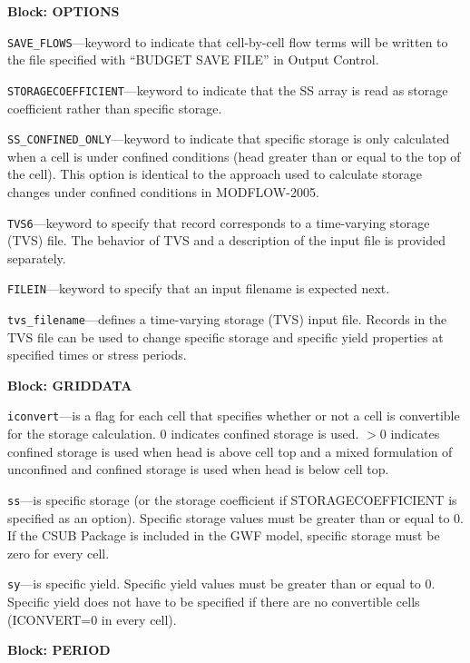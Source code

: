 
\item \textbf{Block: OPTIONS}

\begin{description}
\item \texttt{SAVE\_FLOWS}---keyword to indicate that cell-by-cell flow terms will be written to the file specified with ``BUDGET SAVE FILE'' in Output Control.

\item \texttt{STORAGECOEFFICIENT}---keyword to indicate that the SS array is read as storage coefficient rather than specific storage.

\item \texttt{SS\_CONFINED\_ONLY}---keyword to indicate that specific storage is only calculated when a cell is under confined conditions (head greater than or equal to the top of the cell). This option is identical to the approach used to calculate storage changes under confined conditions in MODFLOW-2005.

\item \texttt{TVS6}---keyword to specify that record corresponds to a time-varying storage (TVS) file.  The behavior of TVS and a description of the input file is provided separately.

\item \texttt{FILEIN}---keyword to specify that an input filename is expected next.

\item \texttt{tvs\_filename}---defines a time-varying storage (TVS) input file.  Records in the TVS file can be used to change specific storage and specific yield properties at specified times or stress periods.

\end{description}
\item \textbf{Block: GRIDDATA}

\begin{description}
\item \texttt{iconvert}---is a flag for each cell that specifies whether or not a cell is convertible for the storage calculation. 0 indicates confined storage is used. $>$0 indicates confined storage is used when head is above cell top and a mixed formulation of unconfined and confined storage is used when head is below cell top.

\item \texttt{ss}---is specific storage (or the storage coefficient if STORAGECOEFFICIENT is specified as an option). Specific storage values must be greater than or equal to 0. If the CSUB Package is included in the GWF model, specific storage must be zero for every cell.

\item \texttt{sy}---is specific yield. Specific yield values must be greater than or equal to 0. Specific yield does not have to be specified if there are no convertible cells (ICONVERT=0 in every cell).

\end{description}
\item \textbf{Block: PERIOD}


